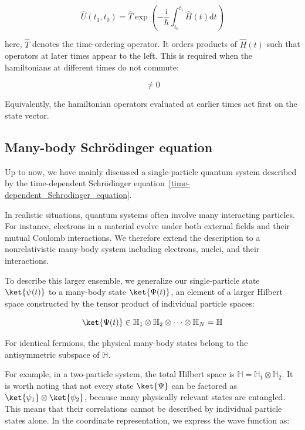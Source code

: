 \begin{equation}
    \hat{U}(t_1,t_0)=\hat{T}\exp\left(-\frac{\mathrm{i}}{\hbar}\int_{t_0}^{t_1}\hat{H}(t)\mathrm{d}t\right)
\label{time-ordering_operator}
\end{equation}

here, $\hat{T}$ denotes the time-ordering operator.
It orders products of $\hat{H}(t)$ such that operators at later times appear to the left.
This is required when the hamiltonians at different times do not commute:

\begin{equation}
    [\hat{H}(t),\hat{H}(t')]\neq 0
\label{hamiltonian_noncommutativity}
\end{equation}

Equivalently, the hamiltonian operators evaluated at earlier times act first on the state vector.

\subsection{Many-body Schrödinger equation}
\label{sec:manybody_schrodinger_equation}

Up to now, we have mainly discussed a single-particle quantum system described by the time-dependent Schrödinger equation~\eqref{time-dependent_Schrodinger_equation}.

In realistic situations, quantum systems often involve many interacting particles.
For instance, electrons in a material evolve under both external fields and their mutual Coulomb interactions.
We therefore extend the description to a nonrelativistic many-body system including electrons, nuclei, and their interactions.

To describe this larger ensemble, we generalize our single-particle state $\ket{\psi(t)}$ to a many-body state $\ket{\Psi(t)}$, an element of a larger Hilbert space constructed by the tensor product of individual particle spaces:

\begin{equation}
    \ket{\Psi(t)}\in \mathbb{H}_1\otimes\mathbb{H}_2\otimes \cdots\otimes\mathbb{H}_N=\mathbb{H}
\label{many-body_state_vector}
\end{equation}

For identical fermions, the physical many-body states belong to the antisymmetric subspace of $\mathbb{H}$.

For example, in a two-particle system, the total Hilbert space is $\mathbb{H}=\mathbb{H}_1\otimes\mathbb{H}_2$.
It is worth noting that not every state $\ket{\Psi}$ can be factored as  $\ket{\psi_1} \otimes \ket{\psi_2}$, because many physically relevant states are entangled.
This means that their correlations cannot be described by individual particle states alone. In the coordinate representation, we express the wave function as:

